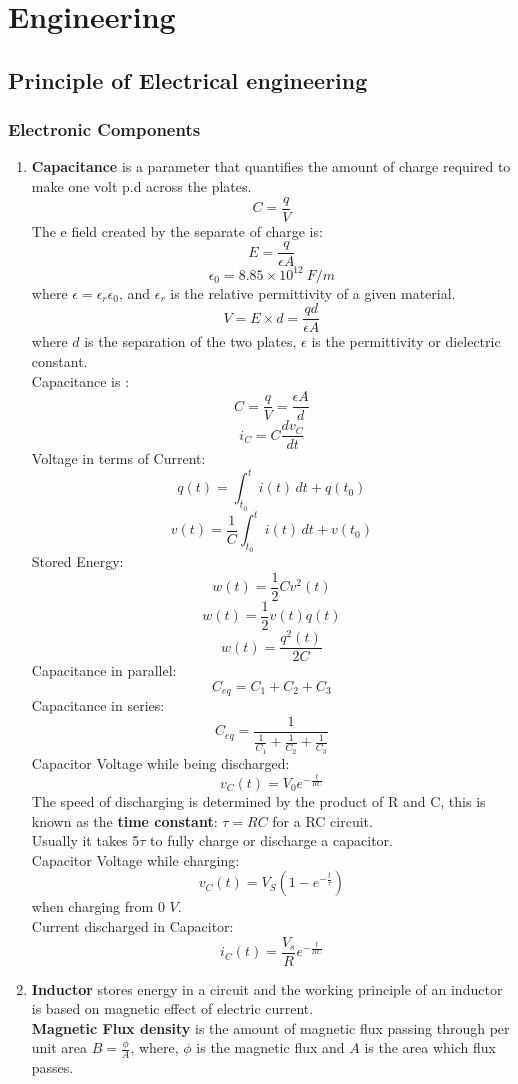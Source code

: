 \documentclass{article}
\begin{document}
\newpage
\section{Engineering}
\subsection{Principle of Electrical engineering}
\subsubsection{Electronic Components}
\begin{enumerate}
    \item \textbf{Capacitance} is a parameter that quantifies the amount of charge required to make one volt p.d across the plates.
\[C=\frac{q}{V}\]
The e field created by the separate of charge is:
\[E=\frac{q}{\epsilon A}\] 
\[\epsilon_0 =8.85\times10^12\ F/m\]
where $\epsilon = \epsilon_r \epsilon_0$, and $\epsilon_r$ is the relative permittivity of a given material. 
\[V=E\times d=\frac{qd}{\epsilon A}\]
where $d$ is the separation of the two plates, $\epsilon$ is the permittivity or dielectric constant.\\
Capacitance is :
\[C=\frac{q}{V}=\frac{\epsilon A}{d}\]
\[i_C = C\frac{dv_C}{dt}\]
Voltage in terms of Current:
\[q(t)=\int^t_{t_0}{i(t)\, dt+q(t_0)}\]
\[v(t)=\frac{1}{C}\int^t_{t_0}{i(t)\, dt+v(t_0)}\]
Stored Energy:
\[w(t)=\frac{1}{2}Cv^2(t)\]
\[w(t)=\frac{1}{2}v(t)q(t)\]
\[w(t)=\frac{q^2(t)}{2C}\]
Capacitance in parallel:
\[C_{eq} = C_1+C_2+C_3\]
Capacitance in series:
\[C_{eq}=\frac{1}{\frac{1}{C_1}+\frac{1}{C_2}+\frac{1}{C_3}}\]
Capacitor Voltage while being discharged:
\[v_{C}(t)=V_0e^{-\frac{t}{RC}}\]
The speed of discharging is determined by the product of R and C, this is known as the \textbf{time constant}: $\tau=RC$ for a RC circuit.\\
Usually it takes 5$\tau$ to fully charge or discharge a capacitor.\\
Capacitor Voltage while charging:
\[v_{C}(t)=V_S(1-e^{-\frac{t}{\tau}})\] when charging from 0 $V$.\\
Current discharged in Capacitor:
\[i_C(t)=\frac{V_s}{R}e^{-\frac{t}{RC}}\]
    \item \textbf{Inductor} stores energy in a circuit and the working principle of an inductor is based on magnetic effect of electric current.\\
\textbf{Magnetic Flux density} is the amount of magnetic flux passing through per unit area $B = \frac{\phi}{A}$, where, $\phi$ is the magnetic flux and $A$ is the area which flux passes.

\end{enumerate}
\end{document}
